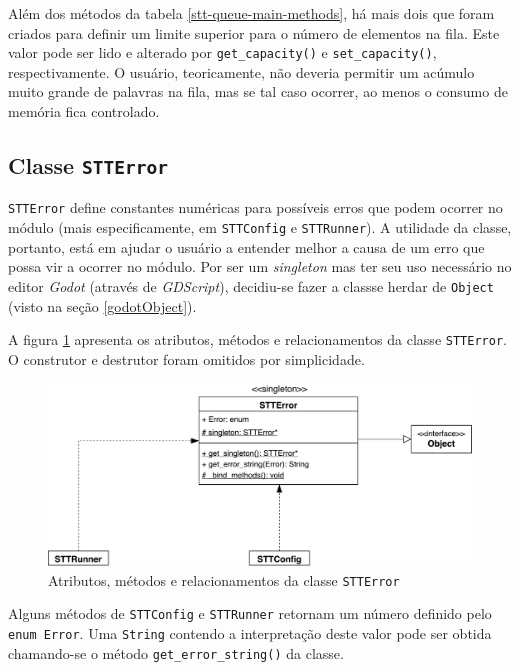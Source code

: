 Além dos métodos da tabela \ref{stt-queue-main-methods}, há mais dois que foram criados para definir um limite superior para o número de elementos na fila. Este valor pode ser lido e alterado por \texttt{get\_capacity()} e \texttt{set\_capacity()}, respectivamente. O usuário, teoricamente, não deveria permitir um acúmulo muito grande de palavras na fila, mas se tal caso ocorrer, ao menos o consumo de memória fica controlado.


\subsection{Classe \texttt{STTError}}

\texttt{STTError} define constantes numéricas para possíveis erros que podem ocorrer no módulo (mais especificamente, em \texttt{STTConfig} e \texttt{STTRunner}). A utilidade da classe, portanto, está em ajudar o usuário a entender melhor a causa de um erro que possa vir a ocorrer no módulo. Por ser um \textit{singleton} mas ter seu uso necessário no editor \textit{Godot} (através de \textit{GDScript}), decidiu-se fazer a classse herdar de \texttt{Object} (visto na seção \ref{godotObject}).

A figura \ref{stt-error-diagram} apresenta os atributos, métodos e relacionamentos da classe \texttt{STTError}. O construtor e destrutor foram omitidos por simplicidade.

\begin{figure}[H]
  \centering
  \includegraphics[width=.9\textwidth]{image/stt-error.pdf}
  \caption{Atributos, métodos e relacionamentos da classe \texttt{STTError}}
  \label{stt-error-diagram}
\end{figure}

Alguns métodos de \texttt{STTConfig} e \texttt{STTRunner} retornam um número definido pelo \texttt{enum Error}. Uma \texttt{String} contendo a interpretação deste valor pode ser obtida chamando-se o método \texttt{get\_error\_string()} da classe.

